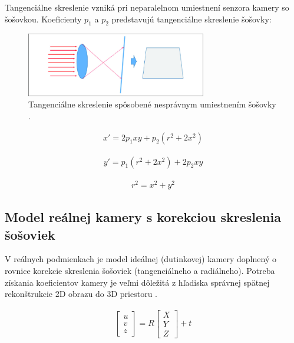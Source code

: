 Tangenciálne skreslenie vzniká pri neparalelnom umiestnení senzora kamery so šošovkou. Koeficienty $p_1$ a $p_2$ predstavujú tangenciálne skreslenie šošovky:

\begin{figure}[h]
	\centering
	\includegraphics[width=0.7\textwidth]{figures/tangential_distortion.png} 
	\caption{Tangenciálne skreslenie spôsobené nesprávnym umiestnením šošovky \cite{lee2019efficient}.}
	\label{fig:tangential_distortion}
\end{figure}

\begin{equation}
\label{eq::tangential_dist::a}
\begin{aligned}
x'= 2p_{1}xy + p_{2}\left(r^{2} + 2x^{2}\right)
\end{aligned}
\end{equation}

\begin{equation}
\label{eq::tangential_dist::b}
\begin{aligned}
y'= p_{1}\left(r^{2} + 2x^{2}\right) + 2p_{2}xy
\end{aligned}
\end{equation}

\begin{equation}
\label{eq::tangential_dist::c}
\begin{aligned}
r^2=x^2+y^2
\end{aligned}
\end{equation}

\subsection{Model reálnej kamery s korekciou skreslenia šošoviek}

V reálnych podmienkach je model ideálnej (dutinkovej) kamery doplnený o rovnice korekcie skreslenia šošoviek (tangenciálneho a radiálneho). Potreba získania koeficientov kamery je veľmi dôležitá z hľadiska správnej spätnej rekonštrukcie 2D obrazu do 3D priestoru \cite{zhang2000flexible}.

\begin{equation}
\label{eq::real_camera::a}
\begin{aligned}
\begin{bmatrix}
u \\ v \\ z
\end{bmatrix} = R
\begin{bmatrix}
X \\ Y \\ Z
\end{bmatrix} + t 
\end{aligned}
\end{equation}

